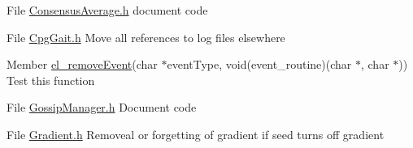 \label{todo__todo000005}
\hypertarget{todo__todo000005}{}
 
\begin{DoxyDescription}
\item[File \hyperlink{ConsensusAverage_8h}{ConsensusAverage.h} ]document code 
\end{DoxyDescription}

\label{todo__todo000004}
\hypertarget{todo__todo000004}{}
 
\begin{DoxyDescription}
\item[File \hyperlink{CpgGait_8h}{CpgGait.h} ]Move all references to log files elsewhere
\end{DoxyDescription}

\label{todo__todo000007}
\hypertarget{todo__todo000007}{}
 
\begin{DoxyDescription}
\item[Member \hyperlink{EventListner_8h_a49b8c52b3390c44cad9bf72cf3a51528}{el\_\-removeEvent}(char $\ast$eventType, void(event\_\-routine)(char $\ast$, char $\ast$)) ]Test this function 
\end{DoxyDescription}

\label{todo__todo000003}
\hypertarget{todo__todo000003}{}
 
\begin{DoxyDescription}
\item[File \hyperlink{GossipManager_8h}{GossipManager.h} ]Document code 
\end{DoxyDescription}

\label{todo__todo000006}
\hypertarget{todo__todo000006}{}
 
\begin{DoxyDescription}
\item[File \hyperlink{Gradient_8h}{Gradient.h} ]Removeal or forgetting of gradient if seed turns off gradient 
\end{DoxyDescription}